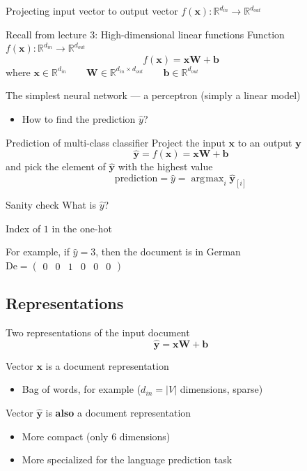 \documentclass[12pt,aspectratio=169,handout]{beamer}
\DeclareMathOperator*{\argmax}{arg\!\max}
\begin{document}
\begin{frame}{Projecting input vector to output vector $f(\bm{x}) : \mathbb{R}^{d_{in}} \to \mathbb{R}^{d_{out}}$}
	
	\pause
	\begin{block}{Recall from lecture 3: High-dimensional linear functions}
		Function $f(\bm{x}) : \mathbb{R}^{d_{in}} \to \mathbb{R}^{d_{out}}$
		$$f(\bm{x}) = \bm{x} \bm{W} + \bm{b}$$
		where
		$\bm{x} \in \mathbb{R}^{d_{in}} \qquad
		\bm{W} \in \mathbb{R}^{d_{in} \times d_{out}} \qquad
		\bm{b} \in \mathbb{R}^{d_{out}}$
	\end{block}	
	
	The simplest neural network --- a perceptron (simply a linear model)
	
	\begin{itemize}
		\item How to find the prediction $\hat{y}$?
	\end{itemize}
	
\end{frame}

\begin{frame}{Prediction of multi-class classifier}
	Project the input $\bm{x}$ to an output $\bm{y}$
	$$\bm{\hat{y}} = f(\bm{x}) = \bm{x} \bm{W} + \bm{b}$$
	and pick the element of $\bm{\hat{y}}$ with the highest value
	$$
	\text{prediction} = \hat{y} = \argmax_{i} \bm{\hat{y}}_{[i]}
	$$
	
	\begin{block}{Sanity check}
		What is $\hat{y}$?
		
		\pause
		Index of $1$ in the one-hot
		
		For example, if $\hat{y} = 3$, then the document is in German
		$\text{De} = \begin{pmatrix}0 & 0 & 1 & 0 & 0 & 0\end{pmatrix}$
	\end{block}
	
\end{frame}

\subsection{Representations}


\begin{frame}{Two representations of the input document}
	$$\bm{\hat{y}} = \bm{x} \bm{W} + \bm{b}$$
	
	Vector $\bm{x}$ is a document representation
	\begin{itemize}
		\item Bag of words, for example ($d_{in} = |V|$ dimensions, sparse)
	\end{itemize}
	
	Vector $\bm{\hat{y}}$ is \textbf{also} a document representation
	\begin{itemize}
		\item More compact (only 6 dimensions)
		\item More specialized for the language prediction task
	\end{itemize}
	
\end{frame}
\end{document}
